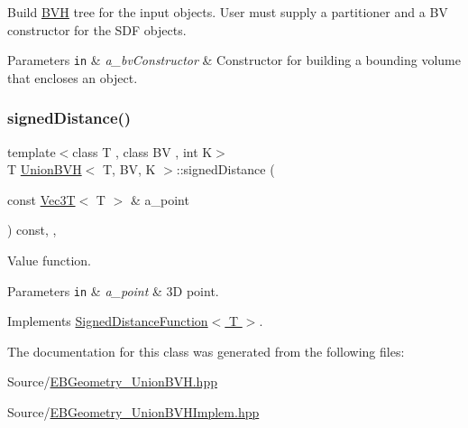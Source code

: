 Build \hyperlink{namespaceBVH}{B\+VH} tree for the input objects. User must supply a partitioner and a BV constructor for the S\+DF objects. 


\begin{DoxyParams}[1]{Parameters}
\mbox{\tt in}  & {\em a\+\_\+bv\+Constructor} & Constructor for building a bounding volume that encloses an object. \\
\hline
\end{DoxyParams}
\mbox{\label{classUnionBVH_a9681fdc161e2e077a33caaddb78fb4ba}} 
\subsubsection{\texorpdfstring{signed\+Distance()}{signedDistance()}}
{\footnotesize\ttfamily template$<$class T , class BV , int K$>$ \\
T \hyperlink{classUnionBVH}{Union\+B\+VH}$<$ T, BV, K $>$\+::signed\+Distance (\begin{DoxyParamCaption}\item[{const \hyperlink{classVec3T}{Vec3T}$<$ T $>$ \&}]{a\+\_\+point }\end{DoxyParamCaption}) const\hspace{0.3cm}{\ttfamily [override]}, {\ttfamily [virtual]}, {\ttfamily [noexcept]}}



Value function. 


\begin{DoxyParams}[1]{Parameters}
\mbox{\tt in}  & {\em a\+\_\+point} & 3D point. \\
\hline
\end{DoxyParams}


Implements \hyperlink{classSignedDistanceFunction_af5912280ca51dc21a2d6949a30ec7d21}{Signed\+Distance\+Function$<$ T $>$}.



The documentation for this class was generated from the following files\+:\begin{DoxyCompactItemize}
\item 
Source/\hyperlink{EBGeometry__UnionBVH_8hpp}{E\+B\+Geometry\+\_\+\+Union\+B\+V\+H.\+hpp}\item 
Source/\hyperlink{EBGeometry__UnionBVHImplem_8hpp}{E\+B\+Geometry\+\_\+\+Union\+B\+V\+H\+Implem.\+hpp}\end{DoxyCompactItemize}
